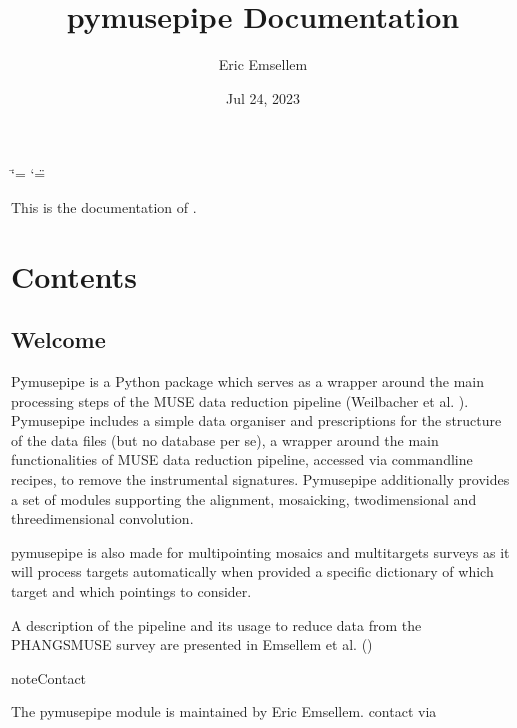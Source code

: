 \documentclass[letterpaper,10pt,english]{sphinxmanual}
\title{pymusepipe Documentation}
\date{Jul 24, 2023}
\author{Eric Emsellem}
\begin{document}
\ifdefined\shorthandoff
  \ifnum\catcode`\=\string=\active\shorthandoff{=}\fi
  \ifnum\catcode`\"=\active{}\fi
\fi

\pagestyle{empty}
\sphinxmaketitle
\pagestyle{plain}
\sphinxtableofcontents
\pagestyle{normal}
\label{\detokenize{index::doc}}


\sphinxAtStartPar
This is the documentation of .


\chapter{Contents}
\label{\detokenize{index:contents}}
\sphinxstepscope


\section{Welcome}
\label{\detokenize{welcome:welcome}}\label{\detokenize{welcome::doc}}
\sphinxAtStartPar
Pymusepipe is a Python package which serves as a wrapper around the main processing steps of the MUSE data reduction pipeline (Weilbacher et al. ). Pymusepipe includes a simple data organiser and prescriptions for the structure of the data files (but no database per se), a wrapper around the main functionalities of MUSE data reduction pipeline, accessed via  command\sphinxhyphen{}line recipes, to remove the instrumental signatures. Pymusepipe additionally provides a set of modules supporting the alignment, mosaicking, two\sphinxhyphen{}dimensional and three\sphinxhyphen{}dimensional convolution.

\sphinxAtStartPar
pymusepipe is also made for multi\sphinxhyphen{}pointing mosaics and multi\sphinxhyphen{}targets surveys
as it will process targets automatically when provided a specific dictionary
of which target and which pointings to consider.

\sphinxAtStartPar
A description of the pipeline and its usage to reduce data from the PHANGS\sphinxhyphen{}MUSE survey are presented in Emsellem et al. ()

\begin{sphinxadmonition}{note}{Contact}

\sphinxAtStartPar
The pymusepipe module is maintained by Eric Emsellem.
contact via 
\end{sphinxadmonition}
\end{document}

